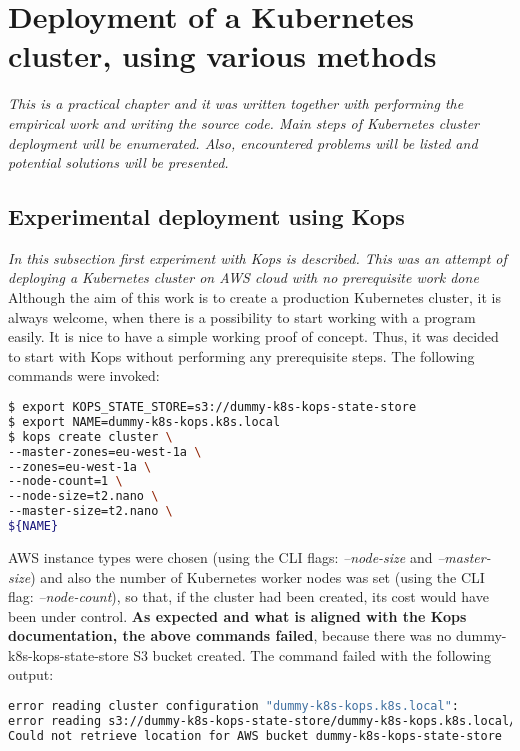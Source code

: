 \section{Deployment of a Kubernetes cluster, using various methods}
\textit{This is a practical chapter and it was written together with performing the empirical work and writing the source code. Main steps of Kubernetes cluster deployment will be enumerated. Also, encountered problems will be listed and potential solutions will be presented.}
\\

\subsection{Experimental deployment using Kops}
\textit{In this subsection first experiment with Kops is described. This was an attempt of deploying a Kubernetes cluster on AWS cloud with no prerequisite work done}
\\

Although the aim of this work is to create a production Kubernetes cluster, it is always welcome, when there is a possibility to start working with a program easily. It is nice to have a simple working proof of concept. Thus, it was decided to start with Kops without performing any prerequisite steps. The following commands were invoked:
\begin{lstlisting}[basicstyle=\small,caption={Commands used to create a cluster with kops, without prerequisite steps performed},captionpos=b,language=Bash,xleftmargin=1cm]
$ export KOPS_STATE_STORE=s3://dummy-k8s-kops-state-store
$ export NAME=dummy-k8s-kops.k8s.local
$ kops create cluster \
--master-zones=eu-west-1a \
--zones=eu-west-1a \
--node-count=1 \
--node-size=t2.nano \
--master-size=t2.nano \
${NAME}
\end{lstlisting}

AWS instance types were chosen (using the CLI flags: \textit{--node-size} and \textit{--master-size}) and also the number of Kubernetes worker nodes was set (using the CLI flag: \textit{--node-count}), so that, if the cluster had been created, its cost would have been under control. \textbf{As expected and what is aligned with the Kops documentation\cite{online-kops-aws}, the above commands failed}, because there was no dummy-k8s-kops-state-store S3 bucket created. The command failed with the following output:
\begin{lstlisting}[basicstyle=\small,caption={Output of the commands used to create a cluster with Kops, without prerequisite steps performed},captionpos=b,language=Bash,xleftmargin=1cm]
error reading cluster configuration "dummy-k8s-kops.k8s.local":
error reading s3://dummy-k8s-kops-state-store/dummy-k8s-kops.k8s.local/config:
Could not retrieve location for AWS bucket dummy-k8s-kops-state-store
\end{lstlisting}

